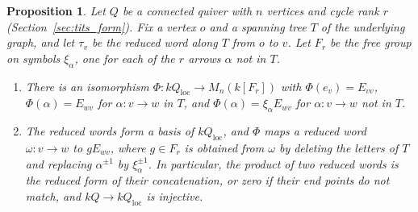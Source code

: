 \documentclass[12pt, a4paper]{report}
\theoremstyle{plain}
\newtheorem{proposition}[theorem]{Proposition}
\theoremstyle{definition}
\theoremstyle{remark}
\theoremstyle{plain}
\begin{document}
\begin{proposition}\label{prop:localisation}
Let $Q$ be a connected quiver with $n$ vertices and cycle rank $r$ (Section~\ref{sec:tits_form}). Fix a vertex $o$ and a spanning tree $T$ of the underlying graph, and let $\tau_v$ be the reduced word along $T$ from $o$ to $v$. Let $F_r$ be the free group on symbols $\xi_\alpha$, one for each of the $r$ arrows $\alpha$ not in $T$.
\begin{enumerate}
  \item There is an isomorphism $\Phi:kQ_{\mathrm{loc}}\to M_n(k[F_r])$ with $\Phi(e_v)=E_{vv}$, $\Phi(\alpha)=E_{wv}$ for $\alpha:v\to w$ in $T$, and $\Phi(\alpha)=\xi_\alpha E_{wv}$ for $\alpha:v\to w$ not in $T$.
  \item The reduced words form a basis of $kQ_{\mathrm{loc}}$, and $\Phi$ maps a reduced word $\omega:v\to w$ to $gE_{wv}$, where $g\in F_r$ is obtained from $\omega$ by deleting the letters of $T$ and replacing $\alpha^{\pm1}$ by $\xi_\alpha^{\pm1}$. In particular, the product of two reduced words is the reduced form of their concatenation, or zero if their end points do not match, and $kQ\to kQ_{\mathrm{loc}}$ is injective.
\end{enumerate}
\end{proposition}
\end{document}
